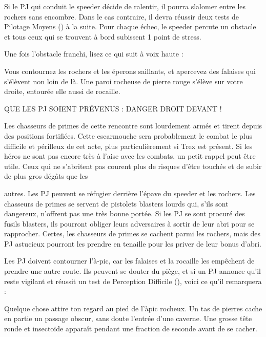 \documentclass[a4paper,10pt,twoside,twocolumn,openany]{book}
\begin{document}
Si le PJ qui conduit le speeder décide de ralentir, il pourra slalomer entre les rochers sans encombre. Dans le
cas contraire, il devra réussir deux tests de Pilotage Moyens (\difficulty \difficulty) à la suite. Pour chaque échec, le speeder
percute un obstacle et tous ceux qui se trouvent à bord
subissent 1 point de stress.


Une fois l’obstacle franchi, lisez ce qui suit à voix
haute :
\begin{quotebox}
    
Vous contournez les rochers et les éperons saillants,
et apercevez des falaises qui s’élèvent non loin de
là. Une paroi rocheuse de pierre rouge s’élève sur
votre droite, entourée elle aussi de rocaille.
\end{quotebox}

\begin{commentbox}{QUE LES PJ SOIENT PRÉVENUS : DANGER DROIT DEVANT !}
  

Les chasseurs de primes de cette rencontre sont
lourdement armés et tirent depuis des positions
fortifiées. Cette escarmouche sera probablement le
combat le plus difficile et périlleux de cet acte, plus
particulièrement si Trex est présent. Si les héros ne
sont pas encore très à l’aise avec les combats, un petit rappel peut être utile.
Ceux qui ne s’abritent pas courent plus de risques
d’être touchés et de subir de plus gros dégâts que les

autres. Les PJ peuvent se réfugier derrière l’épave du
speeder et les rochers.
Les chasseurs de primes se servent de pistolets blasters lourds qui, s’ils sont dangereux, n’offrent pas une
très bonne portée. Si les PJ se sont procuré des fusils
blasters, ils pourront obliger leurs adversaires à sortir
de leur abri pour se rapprocher.
Certes, les chasseurs de primes se cachent parmi les
rochers, mais des PJ astucieux pourront les prendre
en tenaille pour les priver de leur bonus d’abri.
\end{commentbox}

Les PJ doivent contourner l’à-pic, car les falaises et la
rocaille les empêchent de prendre une autre route. Ils
peuvent se douter du piège, et si un PJ annonce qu’il
reste vigilant et réussit un test de Perception Difficile
(\difficulty \difficulty \difficulty), voici ce qu’il remarquera :

\begin{quotebox}
    
Quelque chose attire ton regard au pied de l’àpic rocheux. Un tas de pierres cache en partie un
passage obscur, sans doute l’entrée d’une caverne.
Une grosse tête ronde et insectoïde apparaît pendant une fraction de seconde avant de se cacher.
\end{quotebox}
\end{document}
